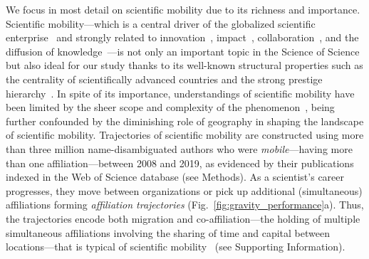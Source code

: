 \documentclass[12pt]{article} %
\def\SI{Supporting Information}
\begin{document}
We focus in most detail on scientific mobility due to its richness and importance.
Scientific mobility---which is a central driver of the globalized scientific enterprise~\autocite{czaika2018globalisation, box2008competition} and strongly related to innovation~\autocite{braunerhjelm2020labor, kaiser2018innovation}, impact~\autocite{sugimoto2017mostimpact, petersen2018multiscale}, collaboration~\autocite{rodrigues2016mobility}, and the diffusion of knowledge~\autocite{braunerhjelm2020labor, morgan2018prestige}---is not only an important topic in the Science of Science but also ideal for our study thanks to its well-known structural properties such as the centrality of scientifically advanced countries and the strong prestige hierarchy~\autocite{clauset2015hierarchy, deville2014career}.
In spite of its importance, understandings of scientific mobility have been limited by the sheer scope and complexity of the phenomenon~\autocite{robinson2019mobility, deville2014career}, being further confounded by the diminishing role of geography in shaping the landscape of scientific mobility. Trajectories of scientific mobility are constructed using more than three million name-disambiguated authors who were \textit{mobile}---having more than one affiliation---between 2008 and 2019, as evidenced by their publications indexed in the Web of Science database (see Methods).
As a scientist's career progresses, they move between organizations or pick up additional (simultaneous) affiliations forming \textit{affiliation trajectories} (Fig.~\ref{fig:gravity_performance}a).
Thus, the trajectories encode both migration and co-affiliation---the holding of multiple simultaneous affiliations involving the sharing of time and capital between locations---that is typical of scientific mobility~\autocite{rodrigues2016mobility, sugimoto2017mostimpact} (see \SI).
\end{document}
